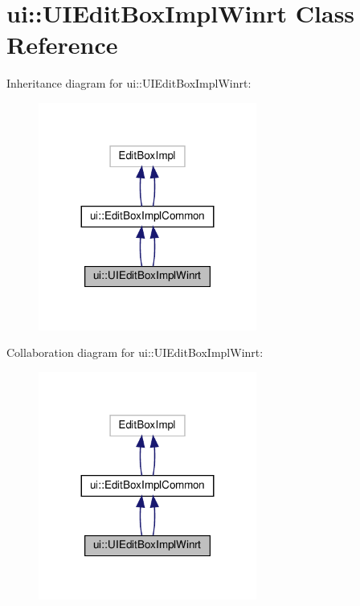 \hypertarget{classui_1_1UIEditBoxImplWinrt}{}\section{ui\+:\+:U\+I\+Edit\+Box\+Impl\+Winrt Class Reference}
\label{classui_1_1UIEditBoxImplWinrt}


Inheritance diagram for ui\+:\+:U\+I\+Edit\+Box\+Impl\+Winrt\+:
\nopagebreak
\begin{figure}[H]
\begin{center}
\leavevmode
\includegraphics[width=203pt]{classui_1_1UIEditBoxImplWinrt__inherit__graph}
\end{center}
\end{figure}


Collaboration diagram for ui\+:\+:U\+I\+Edit\+Box\+Impl\+Winrt\+:
\nopagebreak
\begin{figure}[H]
\begin{center}
\leavevmode
\includegraphics[width=203pt]{classui_1_1UIEditBoxImplWinrt__coll__graph}
\end{center}
\end{figure}
